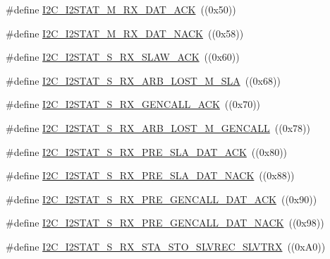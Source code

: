 \begin{DoxyCompactItemize}
\item 
\#define \hyperlink{group___i2_c___private___macros_ga2f07d3cfad351ba3c976d629db20cea2}{I2\+C\+\_\+\+I2\+S\+T\+A\+T\+\_\+\+M\+\_\+\+R\+X\+\_\+\+D\+A\+T\+\_\+\+A\+CK}~((0x50))
\item 
\#define \hyperlink{group___i2_c___private___macros_ga9cc5203175775bfa5ae6df5d6d98b014}{I2\+C\+\_\+\+I2\+S\+T\+A\+T\+\_\+\+M\+\_\+\+R\+X\+\_\+\+D\+A\+T\+\_\+\+N\+A\+CK}~((0x58))
\item 
\#define \hyperlink{group___i2_c___private___macros_ga7055c4b55feda352df8016cbca0c270b}{I2\+C\+\_\+\+I2\+S\+T\+A\+T\+\_\+\+S\+\_\+\+R\+X\+\_\+\+S\+L\+A\+W\+\_\+\+A\+CK}~((0x60))
\item 
\#define \hyperlink{group___i2_c___private___macros_gaf13df6ed7d10be0e063bcbc04d329749}{I2\+C\+\_\+\+I2\+S\+T\+A\+T\+\_\+\+S\+\_\+\+R\+X\+\_\+\+A\+R\+B\+\_\+\+L\+O\+S\+T\+\_\+\+M\+\_\+\+S\+LA}~((0x68))
\item 
\#define \hyperlink{group___i2_c___private___macros_gadcab34e87ad115c011e23a5bd4fb8aa3}{I2\+C\+\_\+\+I2\+S\+T\+A\+T\+\_\+\+S\+\_\+\+R\+X\+\_\+\+G\+E\+N\+C\+A\+L\+L\+\_\+\+A\+CK}~((0x70))
\item 
\#define \hyperlink{group___i2_c___private___macros_ga1605c253472e071e7f77e51bda156ba7}{I2\+C\+\_\+\+I2\+S\+T\+A\+T\+\_\+\+S\+\_\+\+R\+X\+\_\+\+A\+R\+B\+\_\+\+L\+O\+S\+T\+\_\+\+M\+\_\+\+G\+E\+N\+C\+A\+LL}~((0x78))
\item 
\#define \hyperlink{group___i2_c___private___macros_ga4342227592c3e2e345517bd3e6cd8089}{I2\+C\+\_\+\+I2\+S\+T\+A\+T\+\_\+\+S\+\_\+\+R\+X\+\_\+\+P\+R\+E\+\_\+\+S\+L\+A\+\_\+\+D\+A\+T\+\_\+\+A\+CK}~((0x80))
\item 
\#define \hyperlink{group___i2_c___private___macros_gace56a90d55426cc6ab2a4ca540c63d02}{I2\+C\+\_\+\+I2\+S\+T\+A\+T\+\_\+\+S\+\_\+\+R\+X\+\_\+\+P\+R\+E\+\_\+\+S\+L\+A\+\_\+\+D\+A\+T\+\_\+\+N\+A\+CK}~((0x88))
\item 
\#define \hyperlink{group___i2_c___private___macros_ga75dd46ddb054c4d47a531b8e90f7f446}{I2\+C\+\_\+\+I2\+S\+T\+A\+T\+\_\+\+S\+\_\+\+R\+X\+\_\+\+P\+R\+E\+\_\+\+G\+E\+N\+C\+A\+L\+L\+\_\+\+D\+A\+T\+\_\+\+A\+CK}~((0x90))
\item 
\#define \hyperlink{group___i2_c___private___macros_ga20c65f8a82c18211127e5c335026bd76}{I2\+C\+\_\+\+I2\+S\+T\+A\+T\+\_\+\+S\+\_\+\+R\+X\+\_\+\+P\+R\+E\+\_\+\+G\+E\+N\+C\+A\+L\+L\+\_\+\+D\+A\+T\+\_\+\+N\+A\+CK}~((0x98))
\item 
\#define \hyperlink{group___i2_c___private___macros_ga7afe9f0e54aeb9ce8428c0adeb3c3274}{I2\+C\+\_\+\+I2\+S\+T\+A\+T\+\_\+\+S\+\_\+\+R\+X\+\_\+\+S\+T\+A\+\_\+\+S\+T\+O\+\_\+\+S\+L\+V\+R\+E\+C\+\_\+\+S\+L\+V\+T\+RX}~((0x\+A0))

\end{DoxyCompactItemize}
